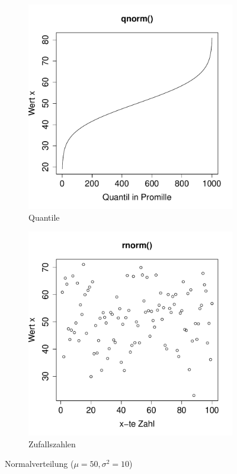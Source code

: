 \begin{figure}[h!]
\begin{subfigure}[b]{0.48\textwidth}
\includegraphics{verteilungen-062}
\caption{Quantile}
\end{subfigure}
\begin{subfigure}[b]{0.48\textwidth}
\includegraphics{verteilungen-063}
\caption{Zufallszahlen}
\end{subfigure}
\caption{Normalverteilung ($\mu=50, \sigma^2=10$)}
\label{fig:norm}
\end{figure}

